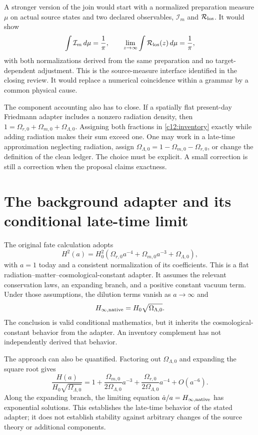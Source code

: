 A stronger version of the join would start with a normalized preparation measure $\mu$ on actual source states and two declared observables, $\mathcal I_m$ and $\mathcal R_{\rm los}$. It would show
\begin{equation}
 \int \mathcal I_m\,d\mu=\frac1\pi,
 \qquad
 \lim_{z\to\infty}\int\mathcal R_{\rm los}(z)\,d\mu=\frac1\pi,
 \label{c12:operatorjoin}
\end{equation}
with both normalizations derived from the same preparation and no target-dependent adjustment. This is the source-measure interface identified in the closing review. It would replace a numerical coincidence within a grammar by a common physical cause.

The component accounting also has to close. If a spatially flat present-day Friedmann adapter includes a nonzero radiation density, then $1=\Omega_{r,0}+\Omega_{m,0}+\Omega_{\Lambda,0}$. Assigning both fractions in \eqref{c12:inventory} exactly while adding radiation makes their sum exceed one. One may work in a late-time approximation neglecting radiation, assign $\Omega_{\Lambda,0}=1-\Omega_{m,0}-\Omega_{r,0}$, or change the definition of the clean ledger. The choice must be explicit. A small correction is still a correction when the proposal claims exactness.

\section{The background adapter and its conditional late-time limit}
The original fate calculation adopts
\begin{equation}
 H^2(a)=H_0^2\left(\Omega_{r,0}a^{-4}
              +\Omega_{m,0}a^{-3}+\Omega_{\Lambda,0}\right),
 \label{c12:friedmann}
\end{equation}
with $a=1$ today and a consistent normalization of its coefficients. This is a flat radiation--matter--cosmological-constant adapter. It assumes the relevant conservation laws, an expanding branch, and a positive constant vacuum term. Under those assumptions, the dilution terms vanish as $a\to\infty$ and
\begin{equation}
 H_{\infty,\rm native}=H_0\sqrt{\Omega_{\Lambda,0}}.
 \label{c12:hinfinity}
\end{equation}
The conclusion is valid conditional mathematics, but it inherits the cosmological-constant behavior from the adapter. An inventory complement has not independently derived that behavior.

The approach can also be quantified. Factoring out $\Omega_{\Lambda,0}$ and expanding the square root gives
\begin{equation}
 \frac{H(a)}{H_0\sqrt{\Omega_{\Lambda,0}}}
 =1+\frac{\Omega_{m,0}}{2\Omega_{\Lambda,0}}a^{-3}
   +\frac{\Omega_{r,0}}{2\Omega_{\Lambda,0}}a^{-4}+O(a^{-6}).
 \label{c12:approach}
\end{equation}
Along the expanding branch, the limiting equation $\dot a/a=H_{\infty,\rm native}$ has exponential solutions. This establishes the late-time behavior of the stated adapter; it does not establish stability against arbitrary changes of the source theory or additional components.

